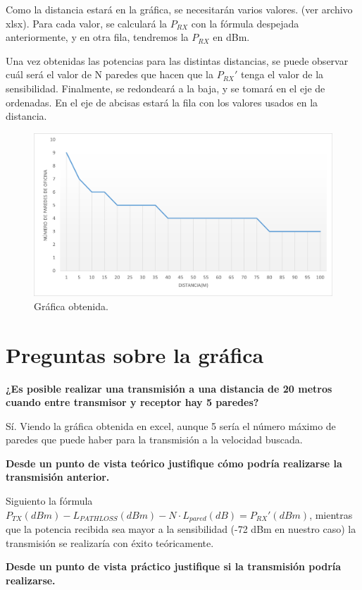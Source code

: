 \documentclass{article}
\begin{document}
Como la distancia estará en la gráfica, se necesitarán varios valores. (ver archivo xlsx).
Para cada valor, se calculará la $P_{RX}$ con la fórmula despejada anteriormente, y en otra fila, tendremos la $P_{RX}$ en dBm.

Una vez obtenidas las potencias para las distintas distancias, se puede observar cuál será el valor de N paredes que hacen que la $P_{RX}'$ tenga el valor de la sensibilidad. Finalmente, se redondeará a la baja, y se tomará en el eje de ordenadas. En el eje de abcisas estará la fila con los valores usados en la distancia.

\begin{figure}[h]
      \centering
      \includegraphics[width=0.6\linewidth]{grafica paredes.png}
      \caption{\label{fig:grafic} Gráfica obtenida.}
\end{figure}

\section{Preguntas sobre la gráfica}

\textbf{¿Es posible realizar una transmisión a una distancia de 20 metros cuando entre transmisor y
receptor hay 5 paredes?}



Sí. Viendo la gráfica obtenida en excel, aunque 5 sería el número máximo de paredes que puede haber para la transmisión a la velocidad buscada. 

\quad

\textbf{Desde un punto de vista teórico justifique cómo podría realizarse la transmisión anterior.}

Siguiento la fórmula $P_{TX}(dBm)-L_{PATHLOSS}(dBm)- N \cdot L_{pared}(dB)=P_{RX}'(dBm)$, mientras que la potencia recibida sea mayor a la sensibilidad (-72 dBm en nuestro caso) la transmisión se realizaría con éxito teóricamente.

\quad

\textbf{Desde un punto de vista práctico justifique si la transmisión podría realizarse.}
\end{document}
